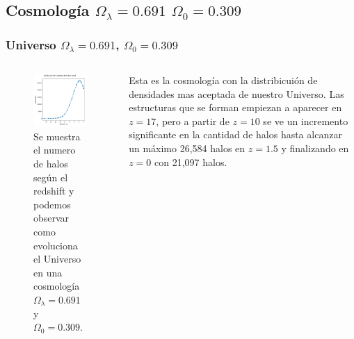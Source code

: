 \documentclass{beamer}
\begin{document}
\subsection{Cosmología \texorpdfstring{$\Omega_\lambda = 0.691$ $\Omega_0 = 0.309$ }{Omega lambda = 0.691, Omega 0 = 0.309} }
	\begin{frame}
		\frametitle{Universo $\Omega_\lambda=0.691$, $\Omega_0=0.309$}
		\begin{columns}[t]
           	\begin{column}{.5\textwidth}

				\begin{figure}
					\centering
					\includegraphics[scale=0.38]{RunCanonica/TotalHalos_RunCanonica.png}
					\caption{\footnotesize Se muestra el numero de halos según el redshift y podemos observar como evoluciona el Universo en una cosmología $\Omega_\lambda = 0.691 $ y $\Omega_0 = 0.309$.}
					\label{fig:TotalHalos_CanonRun}
				\end{figure}

	        \end{column}
			\vspace{0.5cm}
    	    \begin{column}{.5\textwidth}

    	    	Esta es la cosmología con la distribicuión de densidades mas aceptada de nuestro Universo. Las estructuras que se forman empiezan a aparecer en $z=17$, pero a partir de $z=10$ se ve un incremento significante en la cantidad de halos hasta alcanzar un máximo 26,584 halos en $z = 1.5$ y finalizando en $z=0$ con 21,097 halos.

        	\end{column}
	    \end{columns}

	\end{frame}
\end{document}
